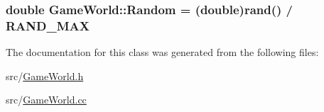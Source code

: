 \subsubsection[{Random}]{\setlength{\rightskip}{0pt plus 5cm}double Game\+World\+::\+Random = (double)rand() / R\+A\+N\+D\+\_\+\+M\+A\+X}\label{classGameWorld_a56652cc9880b3ba1be61395066c863c3}


The documentation for this class was generated from the following files\+:\begin{DoxyCompactItemize}
\item 
src/\hyperlink{GameWorld_8h}{Game\+World.\+h}\item 
src/\hyperlink{GameWorld_8cc}{Game\+World.\+cc}\end{DoxyCompactItemize}

